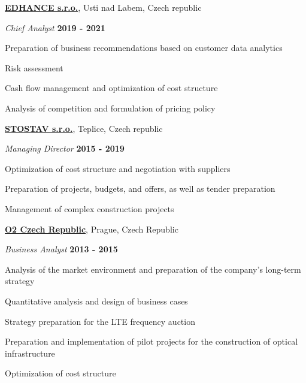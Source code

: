 \documentclass[10pt]{article}
\newenvironment{outerlist}[0]%
        {\begin{itemize}}
	{\end{itemize}
         \vspace{-.6\baselineskip}}
\newenvironment{innerlist}[0]%
        {\begin{compactitem}}
	{\end{compactitem}}
\newcommand{\blankline}{\quad\pagebreak[2]}
\begin{document}
\href{http://www.edhance.cz}{\textbf{EDHANCE s.r.o.}}, 
Usti nad Labem, Czech republic

\begin{outerlist}
	\item[] \textit{Chief Analyst}%
		\hfill \textbf{2019 - 2021}
	\begin{innerlist}
		\item Preparation of business recommendations based on customer data analytics
		\item Risk assessment
		\item Cash flow management and optimization of cost structure
		\item Analysis of competition and formulation of pricing policy
		
	\end{innerlist}
\end{outerlist}
\blankline

\href{http://www.stostav.cz}{\textbf{STOSTAV s.r.o.}}, 
Teplice, Czech republic

\begin{outerlist}
	\item[] \textit{Managing Director}%
		\hfill \textbf{2015 - 2019}
	\begin{innerlist}
		\item Optimization of cost structure and negotiation with suppliers
		\item Preparation of projects, budgets, and offers, as well as tender preparation
		\item Management of complex construction projects
	\end{innerlist}
\end{outerlist}
\blankline

\href{http://www.o2.cz/}{\textbf{O2 Czech Republic}}, Prague, Czech Republic
\begin{outerlist}
	\item[] \textit{Business Analyst}%
		\hfill \textbf{2013 - 2015}
	\begin{innerlist}    
    \item Analysis of the market environment and preparation of the company's long-term strategy
    \item Quantitative analysis and design of business cases
    \item Strategy preparation for the LTE frequency auction
    \item Preparation and implementation of pilot projects for the construction of optical infrastructure
    \item Optimization of cost structure
    
  \end{innerlist}	
		
\end{outerlist}
\end{document}
